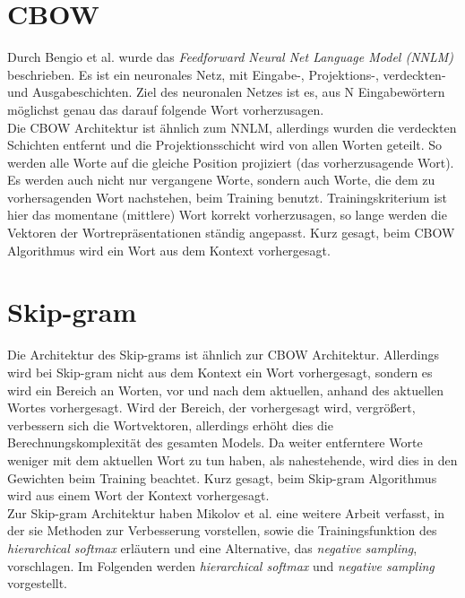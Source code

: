 \documentclass[12pt,a4paper]{report}
\begin{document}
\section{CBOW}
Durch  Bengio et al. \cite{bengio2003neural} wurde das \textit{Feedforward Neural Net Language Model (NNLM)} beschrieben. Es ist ein neuronales Netz, mit Eingabe-, Projektions-, verdeckten- und Ausgabeschichten. Ziel des neuronalen Netzes ist es, aus N Eingabewörtern möglichst genau das darauf folgende Wort vorherzusagen.\\
Die CBOW Architektur ist ähnlich zum NNLM, allerdings wurden die verdeckten Schichten entfernt und die Projektionsschicht wird von allen Worten geteilt. So werden alle Worte auf die gleiche Position projiziert (das vorherzusagende Wort). Es werden auch nicht nur vergangene Worte, sondern auch Worte, die dem zu vorhersagenden Wort nachstehen, beim Training benutzt. Trainingskriterium ist hier das momentane (mittlere) Wort korrekt vorherzusagen, so lange werden die Vektoren der Wortrepräsentationen ständig angepasst. Kurz gesagt, beim CBOW Algorithmus wird ein Wort aus dem Kontext vorhergesagt.



\section{Skip-gram}
Die Architektur des Skip-grams ist ähnlich zur CBOW Architektur. Allerdings wird bei Skip-gram nicht aus dem Kontext ein Wort vorhergesagt, sondern es wird ein Bereich an Worten, vor und nach dem aktuellen, anhand des aktuellen Wortes vorhergesagt. Wird der Bereich, der vorhergesagt wird, vergrößert, verbessern sich die Wortvektoren, allerdings erhöht dies die Berechnungskomplexität des gesamten Models. Da weiter entferntere Worte weniger mit dem aktuellen Wort zu tun haben, als nahestehende, wird dies in den Gewichten beim Training beachtet\citep{DBLP:journals/corr/abs-1301-3781}. Kurz gesagt, beim Skip-gram Algorithmus wird aus einem Wort der Kontext vorhergesagt.\\

Zur Skip-gram Architektur haben Mikolov et al. \citep{DBLP:journals/corr/MikolovSCCD13} eine weitere Arbeit verfasst, in der sie Methoden zur Verbesserung vorstellen, sowie die Trainingsfunktion des \textit{hierarchical softmax} erläutern und eine Alternative, das \textit{negative sampling}, vorschlagen. Im Folgenden werden \textit{hierarchical softmax} und \textit{negative sampling} vorgestellt.\\
\end{document}
